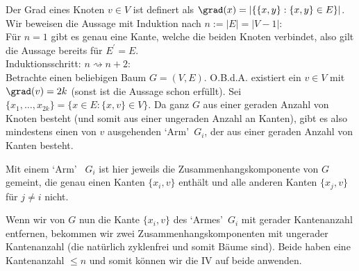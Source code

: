 
\begin{solution}

Der Grad eines Knoten $v \in V$
ist definert als $\grad(x) = |\{\{x, y\}: \{x, y\} \in E\}|$. \\
Wir beweisen die Aussage mit Induktion nach $n := |E| = |V-1|$: \\

Für $n = 1$ gibt es genau eine Kante, welche die beiden Knoten verbindet, 
also gilt die Aussage bereits für $E^\prime = E$. \\

Induktionsschritt: $n \rightsquigarrow n + 2$: \\
Betrachte einen beliebigen Baum $G = (V, E)$.
O.B.d.A. existiert ein $v \in V$ mit $\grad(v) = 2k$ (sonst ist die Aussage schon erfüllt). Sei $\{x_1, \dots, x_{2k}\} = \{x \in E: \{x, v \} \in V\}$.
Da ganz $G$ aus einer geraden Anzahl von Knoten besteht (und somit aus einer ungeraden Anzahl an Kanten), gibt es also mindestens einen von $v$ ausgehenden \textquoteleft{Arm}\textquoteright ~$G_i$, der aus einer geraden Anzahl von Kanten besteht.

Mit einem \textquoteleft{Arm}\textquoteright ~ $G_i$ ist hier jeweils die Zusammenhangskomponente von $G$ gemeint, die genau einen Kanten $\{x_i, v\}$ enthält und alle anderen Kanten $\{x_j, v\}$ für $j \neq i$ nicht.

Wenn wir von $G$ nun die Kante $\{x_i, v\}$ des \textquoteleft{Armes}\textquoteright ~$G_i$ mit gerader Kantenanzahl entfernen, bekommen wir zwei Zusammenhangskomponenten mit ungerader Kantenanzahl (die natürlich zyklenfrei und somit Bäume sind). Beide haben eine Kantenanzahl $\leq n$ und somit können wir die IV auf beide anwenden. \\  

\end{solution}


